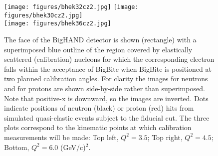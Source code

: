 \documentclass[12pt,letterpaper,oneside]{article}
\begin{document}
\begin{figure}
\begin{center}
\texttt{[image: figures/bhek32cz2.jpg]}\hfill
\texttt{[image: figures/bhek30cz2.jpg]}\\

\vspace{.35in}
\texttt{[image: figures/bhek36cz2.jpg]}

\vspace{.35in}
\caption{\label{calzone2}
The face of the BigHAND detector is shown (rectangle) with a
superimposed blue outline of the region covered by elastically scattered
(calibration) nucleons for which the corresponding electron falls within the
acceptance of BigBite when BigBite is positioned at two planned
calibration angles.  For clarity the images for neutrons and for
protons are shown side-by-side rather than superimposed.  
Note that positive-x is downward, so the images are inverted.
 Dots indicate
positions of neutron (black) or proton (red) hits from simulated
quasi-elastic events subject to the fiducial cut.
The three plots
correspond to the kinematic points at which calibration measurements
will be made: 
Top left, $Q^2=3.5$; Top right, $Q^2=4.5$; Bottom, $Q^2=6.0$
(GeV/c)$^2$.}
\end{center}
\end{figure}
\end{document}
